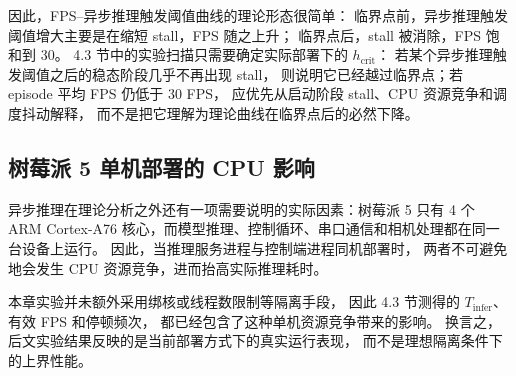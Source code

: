 因此，FPS--异步推理触发阈值曲线的理论形态很简单：
临界点前，异步推理触发阈值增大主要是在缩短 stall，FPS 随之上升；
临界点后，stall 被消除，FPS 饱和到 30。
4.3 节中的实验扫描只需要确定实际部署下的 $h_{\text{crit}}$：
若某个异步推理触发阈值之后的稳态阶段几乎不再出现 stall，
则说明它已经越过临界点；若 episode 平均 FPS 仍低于 30 FPS，
应优先从启动阶段 stall、CPU 资源竞争和调度抖动解释，
而不是把它理解为理论曲线在临界点后的必然下降。

\subsection{树莓派 5 单机部署的 CPU 影响}\label{sec:async-inf-cpu-contention}

异步推理在理论分析之外还有一项需要说明的实际因素：树莓派 5 只有 4 个
ARM Cortex-A76 核心，而模型推理、控制循环、串口通信和相机处理都在同一台设备上运行。
因此，当推理服务进程与控制端进程同机部署时，
两者不可避免地会发生 CPU 资源竞争，进而抬高实际推理耗时。

本章实验并未额外采用绑核或线程数限制等隔离手段，
因此 4.3 节测得的 $T_{\text{infer}}$、有效 FPS 和停顿频次，
都已经包含了这种单机资源竞争带来的影响。
换言之，后文实验结果反映的是当前部署方式下的真实运行表现，
而不是理想隔离条件下的上界性能。
